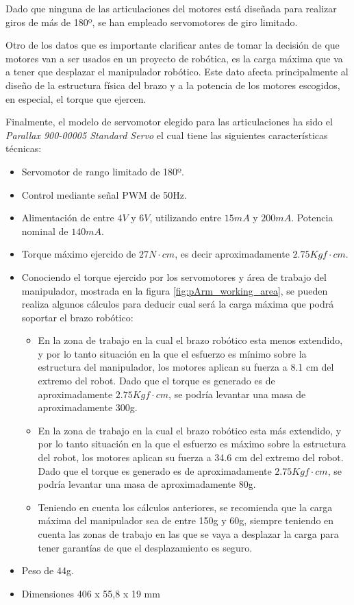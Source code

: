 Dado que ninguna de las articulaciones del motores está diseñada para realizar giros de más de 180º, se han empleado servomotores de giro limitado.

Otro de los datos que es importante clarificar antes de tomar la decisión de que motores van a ser usados en un proyecto de robótica, es la carga máxima que va a tener que desplazar el manipulador robótico. Este dato afecta principalmente al diseño de la estructura física del brazo y a la potencia de los motores escogidos, en especial, el torque que ejercen. 

Finalmente, el modelo de servomotor elegido para las articulaciones ha sido el \textit{Parallax 900-00005 Standard Servo} el cual tiene las siguientes características técnicas:

\begin{itemize}
    \item Servomotor de rango limitado de 180º.
    \item Control mediante señal \ac{PWM} de 50Hz.
    \item Alimentación de entre $4V$ y $6V$, utilizando entre $15mA$ y $200mA$. Potencia nominal de $140mA$.
    \item Torque máximo ejercido de $27N\cdot cm$, es decir aproximadamente $2.75 Kgf\cdot cm$. 
    \item Conociendo el torque ejercido por los servomotores y área de trabajo del manipulador, mostrada en la figura \ref{fig:pArm_working_area}, se pueden realiza algunos cálculos para deducir cual será la carga máxima que podrá soportar el brazo robótico:
    \begin{itemize}
        \item En la zona de trabajo en la cual el brazo robótico esta menos extendido, y por lo tanto situación  en la que el esfuerzo es mínimo sobre la estructura del manipulador, los motores aplican su fuerza a 8.1 cm del extremo del robot. Dado que el torque es generado es de aproximadamente $2.75 Kgf\cdot cm$, se podría levantar una masa de aproximadamente 300g.
        
        \item En la zona de trabajo en la cual el brazo robótico esta más extendido, y por lo tanto situación en la que el esfuerzo es máximo sobre la estructura del robot, los motores aplican su fuerza a 34.6 cm del extremo del robot. Dado que el torque es generado es de aproximadamente $2.75 Kgf\cdot cm$, se podría levantar una masa de aproximadamente 80g.
        
        \item Teniendo en cuenta los cálculos anteriores, se recomienda que la carga máxima del manipulador sea de entre 150g y 60g, siempre teniendo en cuenta las zonas de trabajo en las que se vaya a desplazar la carga para tener garantías de que el desplazamiento es seguro.
    \end{itemize}
    \item Peso de 44g.
    \item Dimensiones 406 x 55,8 x 19 mm
\end{itemize}

